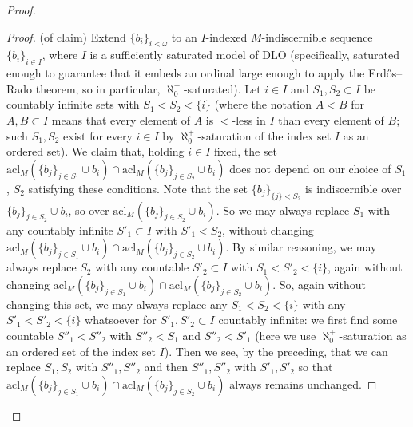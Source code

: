 \documentclass{amsart}
\theoremstyle{definition}
\theoremstyle{remark}
\numberwithin{equation}{section}
\begin{document}
\begin{proof}
\begin{proof}
    (of claim) 
Extend $\{b_{i}\}_{i< \omega}$ to an $I$-indexed $M$-indiscernible sequence $\{b_{i}\}_{i \in I}$, where $I$ is a sufficiently saturated model of $\mathrm{DLO}$ (specifically, saturated enough to guarantee that it embeds an ordinal large enough to apply the Erdős–Rado theorem, so in particular, $\aleph_{0}^{+}$-saturated). Let $i \in I$ and $S_{1}, S_{2} \subset I$  be countably infinite sets with $S_{1} < S_{2} < \{i\}$  (where the notation $A <  B$ for $A, B \subset I$ means that every element of $A$ is $<$-less in $I$ than every element of $B$; such $S_{1}, S_{2}$ exist for every $i \in I$ by $\aleph^{+}_{0}$-saturation of the index set $I$ as an ordered set). We claim that, holding $i \in I$ fixed, the set $\mathrm{acl}_{M}(\{b_j\}_{j \in S_{1}}\cup b_{i}) \cap \mathrm{acl}_{M}(\{b_j\}_{j \in S_{2}}\cup b_{i})$ does not depend on our choice of $S_{1}$, $S_{2}$ satisfying these conditions. Note that the set $\{b_j\}_{\{j\} < S_{2}}$ is indiscernible over $\{b_j\}_{j \in S_{2}}\cup b_{i}$, so over $\mathrm{acl}_{M}(\{b_j\}_{j \in S_{2}}\cup b_{i})$. So we may always replace $S_{1}$ with any countably infinite $S'_{1} \subset I$ with $S'_{1} < S_{2}$, without changing $\mathrm{acl}_{M}(\{b_j\}_{j \in S_{1}}\cup b_{i}) \cap \mathrm{acl}_{M}(\{b_j\}_{j \in S_{2}}\cup b_{i})$. By similar reasoning, we may always replace $S_{2}$ with any countable $S'_{2} \subset I$ with $S_{1} < S'_{2} < \{i\}$, again without changing $\mathrm{acl}_{M}(\{b_j\}_{j \in S_{1}}\cup b_{i}) \cap \mathrm{acl}_{M}(\{b_j\}_{j \in S_{2}}\cup b_{i})$. So, again without changing this set, we may always replace any $S_{1} < S_{2} < \{i\}$ with any $S'_{1} < S'_{2} < \{i\}$ whatsoever for $S'_{1}, S'_{2} \subset I$ countably infinite: we first find some countable $S''_{1} < S''_{2}$ with $S''_{2} < S_{1}$ and $S''_{2} < S'_{1}$ (here we use $\aleph^{+}_{0}$-saturation as an ordered set of the index set $I$). Then we see, by the preceding, that we can replace $S_{1}, S_{2}$ with $S''_{1}, S''_{2}$ and then $S''_{1}, S''_{2}$ with $S'_{1}, S'_{2}$ so that $\mathrm{acl}_{M}(\{b_j\}_{j \in S_{1}}\cup b_{i}) \cap \mathrm{acl}_{M}(\{b_j\}_{j \in S_{2}}\cup b_{i})$ always remains unchanged.


\end{proof}
\end{proof}
\end{document}
